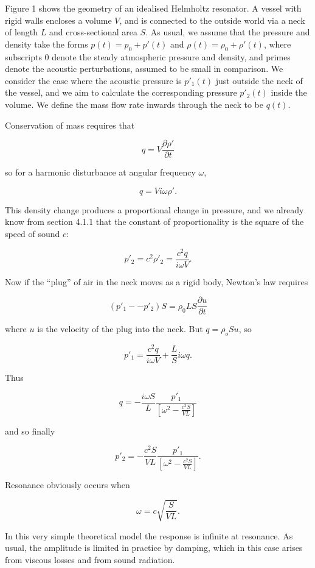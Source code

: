   Figure 1 shows the geometry of an idealised Helmholtz resonator. A vessel 
  with rigid walls encloses a volume $V$, and is connected to the outside world 
  via a neck of length $L$ and cross-sectional area $S$. As usual, we assume 
  that the pressure and density take the forms $p(t)=p_0+p'(t)$ and 
  $\rho(t)=\rho_0+\rho'(t)$, where subscripts 0 denote the steady atmospheric 
  pressure and density, and primes denote the acoustic perturbations, assumed 
  to be small in comparison. We consider the case where the acoustic pressure 
  is $p'_1(t)$ just outside the neck of the vessel, and we aim to calculate the 
  corresponding pressure $p'_2(t)$ inside the volume. We define the mass flow 
  rate inwards through the neck to be $q(t)$. 

  Conservation of mass requires that 

  $$q=V\dfrac{\partial \rho'}{\partial t} \tag{1}$$ 

  so for a harmonic disturbance at angular frequency $\omega$, 

  $$q=V i \omega \rho' . \tag{2}$$ 

  This density change produces a proportional change in pressure, and we 
  already know from section 4.1.1 that the constant of proportionality is the 
  square of the speed of sound $c$: 

  $$p'_2=c^2 \rho'_2 = \dfrac{c^2 q}{i \omega V} . \tag{3}$$ 

  Now if the ``plug'' of air in the neck moves as a rigid body, Newton's law 
  requires 

  $$\left( p'_1 -- p'_2 \right) S = \rho_0 L S \dfrac{\partial u}{\partial t} 
  \tag{4}$$ 

  where $u$ is the velocity of the plug into the neck. But $q=\rho_o S u$, so 

  $$p'_1 = \dfrac{c^2 q}{i \omega V} + \dfrac{L}{S} i \omega q . \tag{5}$$ 

  Thus 

  $$q= -\dfrac{i \omega S}{L} \dfrac{p'_1}{\left[\omega^2 -\frac{c^2 
  S}{VL}\right]} \tag{6}$$ 

  and so finally 

  $$p'_2= -\dfrac{c^2 S}{VL} \dfrac{p'_1}{\left[\omega^2 -\frac{c^2 
  S}{VL}\right]} . \tag{7}$$ 

  Resonance obviously occurs when 

  $$\omega = c \sqrt{\frac{S}{VL}} .\tag{8}$$ 

  In this very simple theoretical model the response is infinite at resonance. 
  As usual, the amplitude is limited in practice by damping, which in this case 
  arises from viscous losses and from sound radiation. 

